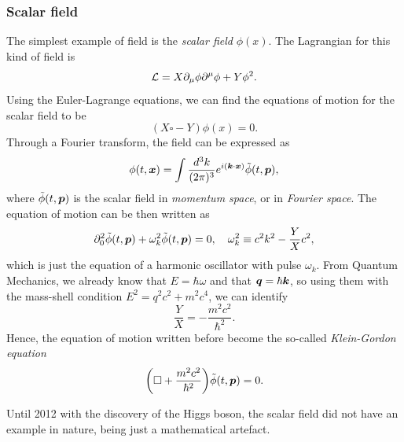 \subsubsection{Scalar field}
The simplest example of field is the \emph{scalar field} $\phi(x)$. The Lagrangian for this kind of field is 
\begin{equation}
    \mathcal{L} = X\partial_\mu\phi\partial^\mu\phi + Y\phi^2.
\end{equation}
Using the Euler-Lagrange equations, we can find the equations of motion for the scalar field to be 
\begin{equation}
    (X\square - Y)\phi(x) = 0.
\end{equation}
Through a Fourier transform, the field can be expressed as 
\begin{equation}
    \phi(t,\bm{x}) = \int \frac{d^3k}{(2\pi)^3}e^{i(\bm{k} \cdot \bm{x})}\tilde{\phi}(t,\bm{p}),
\end{equation}
where $\tilde{\phi}(t,\bm{p})$ is the scalar field in \emph{momentum space}, or in \emph{Fourier space}. The equation of motion can be then written as 
\begin{equation}
    \partial_0^2\tilde{\phi}(t,\bm{p}) + \omega_k^2\tilde{\phi}(t,\bm{p}) = 0,\quad \omega_k^2 \equiv c^2k^2 - \frac{Y}{X}c^2,
\end{equation}
which is just the equation of a harmonic oscillator with pulse $\omega_k$. From Quantum Mechanics, we already know that $E = \hbar\omega$ and that $\bm{q} = \hbar\bm{k}$, so using them with the mass-shell condition $E^2 = q^2c^2 + m^2c^4$, we can identify 
\begin{equation}
    \frac{Y}{X} = -\frac{m^2c^2}{\hbar^2}.
\end{equation}
Hence, the equation of motion written before become the so-called \emph{Klein-Gordon equation}
\begin{equation}
    \bigg(\square + \frac{m^2c^2}{\hbar^2}\bigg)\tilde{\phi}(t,\bm{p}) = 0.
\end{equation}
\begin{obs}
    Until 2012 with the discovery of the Higgs boson, the scalar field did not have an example in nature, being just a mathematical artefact.
\end{obs}

